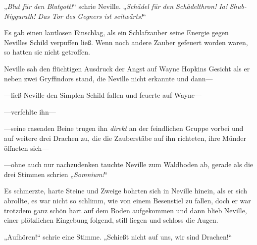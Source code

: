 „\emph{Blut für den Blutgott!}“ schrie Neville. „\emph{Schädel für den Schädelthron! Ia!} \emph{Shub-Niggurath! Das Tor des Gegners ist seitwärts!}“

Es gab einen lautlosen Einschlag, als ein Schlafzauber seine Energie gegen Nevilles Schild verpuffen ließ. Wenn noch andere Zauber gefeuert worden waren, so hatten sie nicht getroffen.

Neville sah den flüchtigen Ausdruck der Angst auf Wayne Hopkins Gesicht als er neben zwei Gryffindors stand, die Neville nicht erkannte und dann—

—ließ Neville den Simplen Schild fallen und feuerte auf Wayne—

—verfehlte ihn—

—seine rasenden Beine trugen ihn \emph{direkt} an der feindlichen Gruppe vorbei und auf weitere drei Drachen zu, die die Zauberstäbe auf ihn richteten, ihre Münder öffneten sich—

—ohne auch nur nachzudenken tauchte Neville zum Waldboden ab, gerade als die drei Stimmen schrien „\emph{Somnium!}“

Es schmerzte, harte Steine und Zweige bohrten sich in Neville hinein, als er sich abrollte, es war nicht so schlimm, wie von einem Besenstiel zu fallen, doch er war trotzdem ganz schön hart auf dem Boden aufgekommen und dann blieb Neville, einer plötzlichen Eingebung folgend, still liegen und schloss die Augen.

„Aufhören!“ schrie eine Stimme. „Schießt nicht auf uns, wir sind Drachen!“

